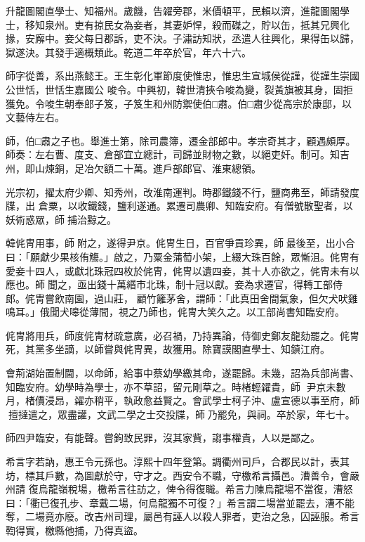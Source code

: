 \begin{pinyinscope}
 升龍圖閣直學士、知福州。歲饑，告糴旁郡，米價頓平，民賴以濟，進龍圖閣學士，移知泉州。吏有掠民女為妾者，其妻妒悍，殺而磔之，貯以缶，抵其兄興化掾，安廨中。妾父每日郡訴，吏不決。子潚訪知狀，丞遣人往興化，果得缶以歸，獄遂決。其發手適概類此。乾道二年卒於官，年六十六。



 師字從善，系出燕懿王。王生彰化軍節度使惟忠，惟忠生宣城侯從謹，從謹生崇國公世恬，世恬生嘉國公
 唆令。中興初，韓世清挾令唆為變，裂黃旗被其身，固拒獲免。令唆生朝奉郎子笈，子笈生和州防禦使伯□肅。伯□肅少從高宗於康邸，以文藝侍左右。



 師，伯□肅之子也。舉進士第，除司農簿，遷金部郎中。孝宗奇其才，顧遇頗厚。師奏：左右曹、度支、倉部宜立總計，司歸並財物之數，以絕吏奸。制可。知吉州，即山煉銅，足冶欠額二十萬。進戶部郎官、淮東總領。



 光宗初，擢太府少卿、知秀州，改淮南運判。時郡鐵錢不行，鹽商弗至，師請發度牒，出
 倉粟，以收鐵錢，鹽利遂通。累遷司農卿、知臨安府。有僧號散聖者，以妖術惑眾，師𢍰捕治黥之。



 韓侂冑用事，師𢍰附之，遂得尹京。侂冑生日，百官爭貢珍異，師𢍰最後至，出小合曰：「願獻少果核侑觴。」啟之，乃粟金蒲萄小架，上綴大珠百餘，眾慚沮。侂冑有愛妾十四人，或獻北珠冠四枚於侂冑，侂冑以遺四妾，其十人亦欲之，侂冑未有以應也。師𢍰聞之，亟出錢十萬緡市北珠，制十冠以獻。妾為求遷官，得轉工部侍郎。侂冑嘗飲南園，過山莊，
 顧竹籬茅舍，謂師：「此真田舍間氣象，但欠犬吠雞鳴耳。」俄聞犬嗥從薄間，視之乃師也，侂冑大笑久之。以工部尚書知臨安府。



 侂冑將用兵，師度侂冑材疏意廣，必召禍，乃持異論，侍御史鄭友龍劾罷之。侂冑死，其黨多坐謫，以師嘗與侂冑異，故獲用。除寶謨閣直學士、知鎮江府。



 會荊湖始置制閫，以命師，給事中蔡幼學繳其命，遂罷歸。未幾，詔為兵部尚書、知臨安府。幼學時為學士，亦不草詔，留元剛草之。時楮輕糴貴，師𢍰
 尹京未數月，楮價浸昂，糴亦稍平，執政愈益賢之。會武學士柯子沖、盧宣德以事至府，師𢍰擅撻遣之，眾盡讙，文武二學之士交投牒，師𢍰乃罷免，與祠。卒於家，年七十。



 師四尹臨安，有能聲。嘗鉤致民罪，沒其家貲，謅事權貴，人以是鄙之。



 希言字若訥，惠王令元孫也。淳熙十四年登第。調衢州司戶，合郡民以計，表其坊，標其戶數，為圖獻於守，守才之。西安令不職，守檄希言攝邑。漕善令，會嚴州請
 復烏龍嶺稅場，檄希言往訪之，俾令得復職。希言力陳烏龍場不當復，漕怒曰：「衢已復孔步、章戴二場，何烏龍獨不可復？」希言謂二場當並罷去，漕不能奪，二場竟亦廢。改吉州司理，屬邑有誣人以殺人罪者，吏治之急，囚誣服。希言鞫得實，檄縣他捕，乃得真盜。




\end{pinyinscope}
